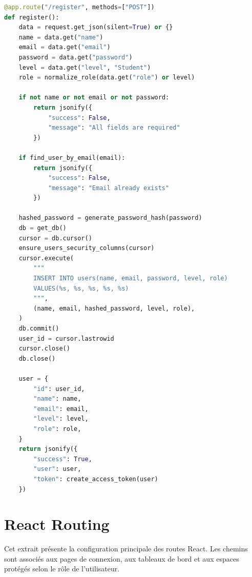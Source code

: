 \documentclass[12pt,a4paper]{report}
\begin{document}
\begin{lstlisting}[style=learnixcode,language=Python,caption={Route Flask d'inscription utilisateur},label={lst:registration}]
@app.route("/register", methods=["POST"])
def register():
    data = request.get_json(silent=True) or {}
    name = data.get("name")
    email = data.get("email")
    password = data.get("password")
    level = data.get("level", "Student")
    role = normalize_role(data.get("role") or level)

    if not name or not email or not password:
        return jsonify({
            "success": False,
            "message": "All fields are required"
        })

    if find_user_by_email(email):
        return jsonify({
            "success": False,
            "message": "Email already exists"
        })

    hashed_password = generate_password_hash(password)
    db = get_db()
    cursor = db.cursor()
    ensure_users_security_columns(cursor)
    cursor.execute(
        """
        INSERT INTO users(name, email, password, level, role)
        VALUES(%s, %s, %s, %s, %s)
        """,
        (name, email, hashed_password, level, role),
    )
    db.commit()
    user_id = cursor.lastrowid
    cursor.close()
    db.close()

    user = {
        "id": user_id,
        "name": name,
        "email": email,
        "level": level,
        "role": role,
    }
    return jsonify({
        "success": True,
        "user": user,
        "token": create_access_token(user)
    })
\end{lstlisting}

\section{React Routing}
Cet extrait présente la configuration principale des routes React. Les chemins
sont associés aux pages de connexion, aux tableaux de bord et aux espaces
protégés selon le rôle de l'utilisateur.
\end{document}

